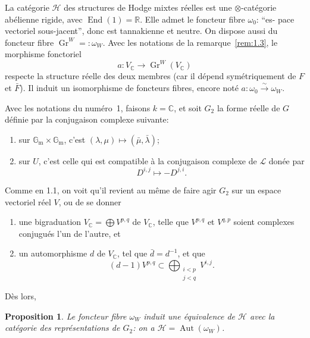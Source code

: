 \documentclass[12pt,a4paper]{article}
\theoremstyle{plain}
\newtheorem{proposition}[lemme]{Proposition}
\theoremstyle{definition}
\DeclareMathOperator{\Gr}{Gr}
\DeclareMathOperator{\Aut}{Aut}
\DeclareMathOperator{\End}{End}
\newcommand{\Gm}{\mathbb{G}_\mathrm{m}}
\newcommand{\C}{\mathbb{C}}
\newcommand{\R}{\mathbb{R}}
\begin{document}
La cat\'{e}gorie $\mathscr{H}$ des structures de Hodge mixtes r\'{e}elles est une $\otimes$-cat\'{e}gorie
ab\'{e}lienne rigide, avec $\End(1) = \R$. Elle admet le foncteur fibre $\omega_0$: ``es-
pace vectoriel sous-jacent'', donc est tannakienne et neutre. On dispose aussi
du foncteur fibre $\Gr^W =: \omega_W$. Avec les notations de la remarque~\ref{rem:1.3}, le
morphisme fonctoriel
\begin{equation*}
a : V_\C \longrightarrow \Gr^W(V_\C)
\end{equation*}
respecte la structure r\'{e}elle des deux membres (car il d\'{e}pend sym\'{e}triquement
de $F$ et $\bar{F}$). Il induit un isomorphisme de foncteurs fibres, encore not\'{e}
$a : \omega_0 \xrightarrow{\sim} \omega_W$.

Avec les notations du num\'{e}ro~1, faisons $k = \C$, et soit $G_2$ la forme r\'{e}elle
de $G$ d\'{e}finie par la conjugaison complexe suivante:
\begin{enumerate}[label=\alph*)]
\item sur $\Gm \times \Gm$, c'est $(\lambda, \mu) \mapsto (\bar{\mu}, \bar{\lambda})$;
\item sur $U$, c'est celle qui est compatible \`{a} la conjugaison complexe de $\mathcal{L}$
don\'{e}e par
\begin{equation*}
D^{i,j} \mapsto -D^{j,i}.
\end{equation*}
\end{enumerate}

Comme en 1.1, on voit qu'il revient au m\^{e}me de faire agir $G_2$ sur un
espace vectoriel r\'{e}el $V$, ou de se donner
\begin{enumerate}[label=\alph*)]
\item une bigraduation $V_\C = \bigoplus V^{p,q}$ de $V_\C$, telle que $V^{p,q}$ et $V^{q,p}$ soient
complexes conjugu\'{e}s l'un de l'autre, et
\item un automorphisme $d$ de $V_\C$, tel que $\bar{d} = d^{-1}$, et que
\begin{equation*}
(d-1)V^{p,q} \subset \bigoplus_{\substack{i < p \\ j < q}} V^{i,j}.
\end{equation*}
\end{enumerate}

D\`{e}s lors,

\begin{proposition}\label{prop:2.1}
Le foncteur fibre $\omega_W$ induit une \'{e}quivalence de $\mathscr{H}$ avec
la cat\'{e}gorie des repr\'{e}sentations de $G_2$: on a $\mathscr{H} = \Aut(\omega_W)$.
\end{proposition}
\end{document}
